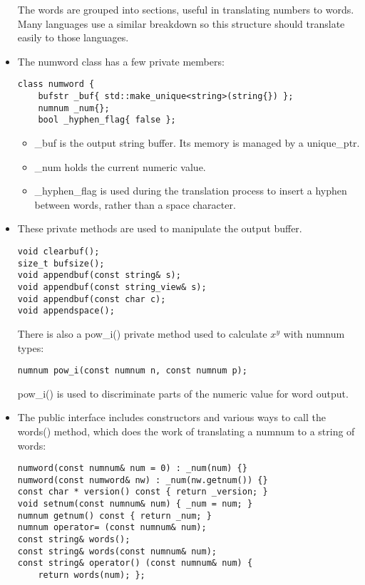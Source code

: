 \begin{itemize}
The words are grouped into sections, useful in translating numbers to words. Many languages use a similar breakdown so this structure should translate easily to those languages.

\item 
The numword class has a few private members:

\begin{lstlisting}[style=styleCXX]
class numword {
	bufstr _buf{ std::make_unique<string>(string{}) };
	numnum _num{};
	bool _hyphen_flag{ false };
\end{lstlisting}

\begin{itemize}
\item 
\_buf is the output string buffer. Its memory is managed by a unique\_ptr.

\item 
\_num holds the current numeric value.

\item 
\_hyphen\_flag is used during the translation process to insert a hyphen between words, rather than a space character.
\end{itemize}

\item 
These private methods are used to manipulate the output buffer.

\begin{lstlisting}[style=styleCXX]
void clearbuf();
size_t bufsize();
void appendbuf(const string& s);
void appendbuf(const string_view& s);
void appendbuf(const char c);
void appendspace();
\end{lstlisting}

There is also a pow\_i() private method used to calculate $x^y$ with numnum types:

\begin{lstlisting}[style=styleCXX]
numnum pow_i(const numnum n, const numnum p);
\end{lstlisting}

pow\_i() is used to discriminate parts of the numeric value for word output.

\item 
The public interface includes constructors and various ways to call the words() method, which does the work of translating a numnum to a string of words:

\begin{lstlisting}[style=styleCXX]
numword(const numnum& num = 0) : _num(num) {}
numword(const numword& nw) : _num(nw.getnum()) {}
const char * version() const { return _version; }
void setnum(const numnum& num) { _num = num; }
numnum getnum() const { return _num; }
numnum operator= (const numnum& num);
const string& words();
const string& words(const numnum& num);
const string& operator() (const numnum& num) {
	return words(num); };
\end{lstlisting}


\end{itemize}
